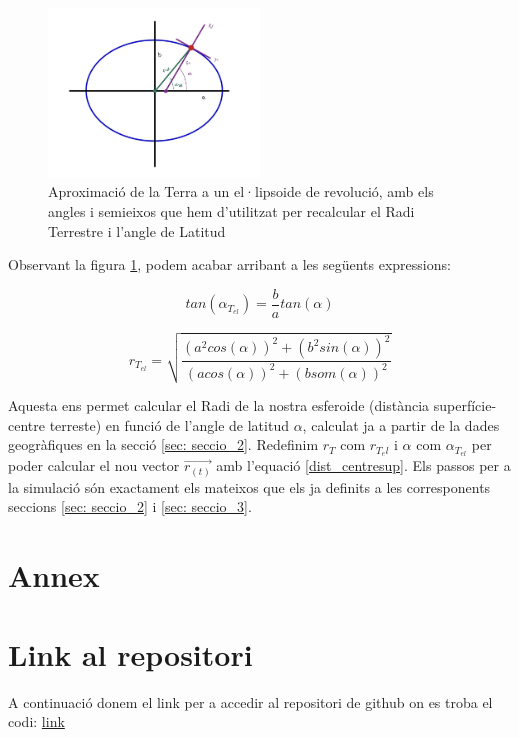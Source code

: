 \documentclass[11pt]{article}
\begin{document}
\begin{figure}[H]
    \centering
    \includegraphics[width=0.5\textwidth]{Terraelipsoide.jpg}
    \caption{Aproximació de la Terra a un el·lipsoide de revolució, amb els angles i semieixos que hem d'utilitzat per recalcular el Radi Terrestre i l'angle de Latitud}
    \label{fig:terraelipsoide}
\end{figure}

Observant la figura \ref{fig:terraelipsoide}, podem acabar arribant a les següents expressions:

\begin{equation}
    tan(\alpha_{T_{el}}) = \frac{b}{a}tan(\alpha) 
\end{equation}

\begin{equation}
    r_{T_{el}} = \sqrt{\frac{(a^2cos(\alpha))^2+(b^2sin(\alpha))^2}{(acos(\alpha))^2+(bsom(\alpha))^2}}
\end{equation}

Aquesta ens permet calcular el Radi de la nostra esferoide (distància superfície-centre terreste) en funció de l'angle de latitud $\alpha$, calculat ja a partir de la dades geogràfiques en la secció \ref{sec: seccio_2}. Redefinim $r_T$ com $r_{T_el}$ i $\alpha$ com $\alpha_{T_{el}}$ per poder calcular el nou vector $\vec{r_{(t)}}$ amb l'equació \eqref{dist_centresup}. Els passos per a la simulació són exactament els mateixos que els ja definits a les corresponents seccions \ref{sec: seccio_2} i \ref{sec: seccio_3}.

\section*{Annex}
\appendix

\section{Link al repositori}
\vspace{-1em}
A continuació donem el link per a accedir al repositori de github on es troba el codi: \href{https://github.com/isaacbg25/Sol/tree/main}{link}
\end{document}
